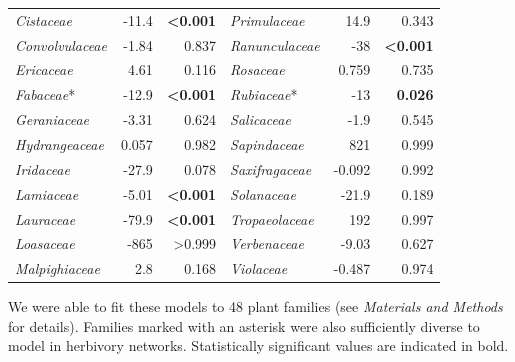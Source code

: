 \documentclass[12pt]{article}
\begin{document}
\begin{table}[!h]
\begin{tabular}{|l  rr|| l rr|}
    \emph{Cistaceae}  & -11.4 & \textbf{\textless0.001} & \emph{Primulaceae}  & 14.9  & 0.343 \\
    \emph{Convolvulaceae} & -1.84 & 0.837 & \emph{Ranunculaceae}  & -38 & \textbf{\textless0.001} \\
    \emph{Ericaceae}  & 4.61  & 0.116 & \emph{Rosaceae} & 0.759 & 0.735 \\
    \emph{Fabaceae}*  & -12.9 & \textbf{\textless0.001} & \emph{Rubiaceae}* & -13 & \textbf{0.026}  \\
    \emph{Geraniaceae}  & -3.31 & 0.624 & \emph{Salicaceae} & -1.9  & 0.545 \\
    \emph{Hydrangeaceae}  & 0.057 & 0.982 & \emph{Sapindaceae}  & 821 & 0.999 \\
    \emph{Iridaceae}  & -27.9 & 0.078 & \emph{Saxifragaceae}  & -0.092  & 0.992 \\
    \emph{Lamiaceae}  & -5.01 & \textbf{\textless0.001} & \emph{Solanaceae} & -21.9 & 0.189 \\
    \emph{Lauraceae}  & -79.9 & \textbf{\textless0.001} & \emph{Tropaeolaceae}  & 192 & 0.997 \\
    \emph{Loasaceae}  & -865  & \textgreater0.999 & \emph{Verbenaceae}  & -9.03 & 0.627 \\
    \emph{Malpighiaceae}  & 2.8 & 0.168 & \emph{Violaceae}  & -0.487  & 0.974 \\
  \hline
  \end{tabular}
  \smallskip
  \footnotesize

    We were able to fit these models to 48 plant families (see \emph{Materials and Methods} for details). 
    Families marked with an asterisk were also sufficiently diverse to model in herbivory networks. 
    Statistically significant values are indicated in bold. 

    \end{table}

\clearpage
\end{document}
